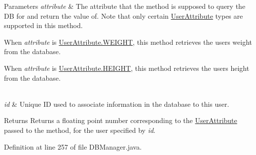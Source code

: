 \begin{DoxyParams}{Parameters}
{\em attribute} & The attribute that the method is supposed to query the DB for and return the value of. Note that only certain \mbox{\hyperlink{enumcom_1_1activitytracker_1_1_user_attribute}{User\+Attribute}} types are supported in this method.
\begin{DoxyItemize}
\item When {\itshape attribute} is \mbox{\hyperlink{enumcom_1_1activitytracker_1_1_user_attribute_a024206b0dc3261031ef586b3f0fd530c}{User\+Attribute.\+W\+E\+I\+G\+HT}}, this method retrieves the user\textquotesingle{}s weight from the database.
\item When {\itshape attribute} is \mbox{\hyperlink{enumcom_1_1activitytracker_1_1_user_attribute_a0a80ca5cce8eb4494c2128bd4291a5b7}{User\+Attribute.\+H\+E\+I\+G\+HT}}, this method retrieves the user\textquotesingle{}s height from the database. 
\end{DoxyItemize}\\
\hline
{\em id} & Unique ID used to associate information in the database to this user.\\
\hline
\end{DoxyParams}
\begin{DoxyReturn}{Returns}
Returns a floating point number corresponding to the \mbox{\hyperlink{enumcom_1_1activitytracker_1_1_user_attribute}{User\+Attribute}} passed to the method, for the user specified by {\itshape id}. 
\end{DoxyReturn}


Definition at line 257 of file D\+B\+Manager.\+java.



